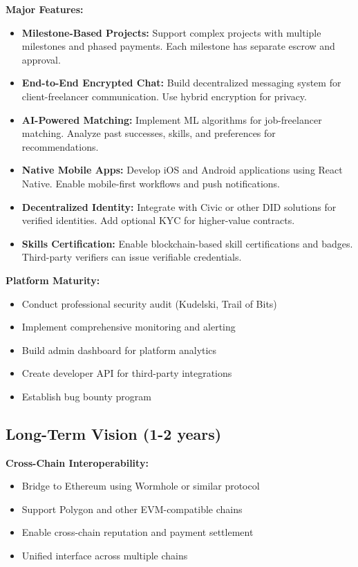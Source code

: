 \documentclass[a4paper,13pt,twoside]{report}
\theoremstyle{definition}
\begin{document}
\textbf{Major Features:}
\begin{itemize}
    \item \textbf{Milestone-Based Projects:} Support complex projects with multiple milestones and phased payments. Each milestone has separate escrow and approval.

    \item \textbf{End-to-End Encrypted Chat:} Build decentralized messaging system for client-freelancer communication. Use hybrid encryption for privacy.

    \item \textbf{AI-Powered Matching:} Implement ML algorithms for job-freelancer matching. Analyze past successes, skills, and preferences for recommendations.

    \item \textbf{Native Mobile Apps:} Develop iOS and Android applications using React Native. Enable mobile-first workflows and push notifications.

    \item \textbf{Decentralized Identity:} Integrate with Civic or other DID solutions for verified identities. Add optional KYC for higher-value contracts.

    \item \textbf{Skills Certification:} Enable blockchain-based skill certifications and badges. Third-party verifiers can issue verifiable credentials.
\end{itemize}

\textbf{Platform Maturity:}
\begin{itemize}
    \item Conduct professional security audit (Kudelski, Trail of Bits)
    \item Implement comprehensive monitoring and alerting
    \item Build admin dashboard for platform analytics
    \item Create developer API for third-party integrations
    \item Establish bug bounty program
\end{itemize}

\subsection{Long-Term Vision (1-2 years)}

\textbf{Cross-Chain Interoperability:}
\begin{itemize}
    \item Bridge to Ethereum using Wormhole or similar protocol
    \item Support Polygon and other EVM-compatible chains
    \item Enable cross-chain reputation and payment settlement
    \item Unified interface across multiple chains
\end{itemize}
\end{document}
